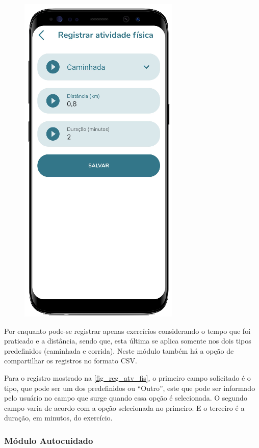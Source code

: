 \begin{figure}[htb]
\begin{minipage}{0.45\textwidth}
        \includegraphics[scale=0.66]{Imagens/desenvolvimento/app/reg_atv_fis.png}
    \end{minipage}
\end{figure}

Por enquanto pode-se registrar apenas exercícios considerando o tempo que foi praticado e a distância, sendo
que, esta última se aplica somente nos dois tipos predefinidos (caminhada e corrida). Neste módulo também há a
opção de compartilhar os registros no formato CSV\@.

Para o registro mostrado na \autoref{fig_reg_atv_fis}, o primeiro campo solicitado é o tipo, que pode ser um
dos predefinidos ou “Outro”, este que pode ser informado pelo usuário no campo que surge quando essa opção é
selecionada. O segundo campo varia de acordo com a opção selecionada no primeiro. E o terceiro é a duração,
em minutos, do exercício.

\subsubsection{Módulo Autocuidado}

